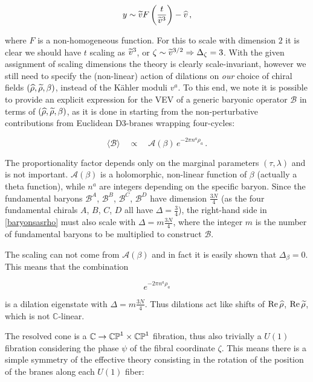 \begin{equation}
	y \sim \widetilde{v} F\left( \frac{t}{{\widetilde{v}}^3} \right) - \widehat{v}\,,
	\label{}
\end{equation}

where $F$ is a non-homogeneous function. For this to scale with dimension $2$ it is clear we should have $t$ scaling as $\widetilde{v}^3$, or $\zeta \sim {\ensuremath{\widetilde{v}}}^{3/2} \Rightarrow \Delta_\zeta = 3$. With the given assignment of scaling dimensions the theory is clearly scale-invariant, however we still need to specify the (non-linear) action of dilations on \emph{our} choice of chiral fields $(\widehat{\rho},\widetilde{\rho},\beta)$, instead of the K\"ahler moduli $v^a$. To this end, we note it is possible to provide an explicit expression for the VEV of a generic baryonic operator $\mathcal{B}$ in terms of $(\widehat{\rho}, \widetilde{\rho}, \beta)$, as it is done in \cite{MZ} starting from the non-perturbative contributions from Euclidean D3-branes wrapping four-cycles:

\begin{equation}
	\langle \mathcal{B} \rangle \quad \propto \quad \mathcal{A}(\beta) \, e^{-2\pi n^a \rho_a}\,.
	\label{baryonsasrho}
\end{equation}

The proportionality factor depends only on the marginal parameters $(\tau,\lambda)$ and is not important. $\mathcal{A}(\beta)$ is a holomorphic, non-linear function of $\beta$ (actually a theta function), while $n^a$ are integers depending on the specific baryon. Since the fundamental baryons $\mathcal{B}^A$, $\mathcal{B}^B$, $\mathcal{B}^C$, $\mathcal{B}^D$ have dimension $\frac{3N}{4}$ (as the four fundamental chirals $A$, $B$, $C$, $D$ all have $\Delta = \frac{3}{4}$), the right-hand side in \eqref{baryonsasrho} must also scale with $\Delta = m\frac{3N}{4}$, where the integer $m$ is the number of fundamental baryons to be multiplied to construct $\mathcal{B}$.

The scaling can not come from $\mathcal{A}(\beta)$ and in fact it is easily shown that $\Delta_\beta = 0$. This means that the combination

\begin{equation}
	e^{-2\pi n^a \rho_a}
	\label{}
\end{equation}

is a dilation eigenstate with $\Delta = m\frac{3N}{4}$. Thus dilations act like shifts of $\operatorname{Re} \widehat{\rho}$, $\operatorname{Re} \widetilde{\rho}$, which is not $\mathbb{C}$-linear.

The resolved cone is a $\mathbb{C} \rightarrow \mathbb{CP}^1 \times \mathbb{CP}^1$ fibration, thus also trivially a $U(1)$ fibration considering the phase $\psi$ of the fibral coordinate $\zeta$. This means there is a simple symmetry of the effective theory consisting in the rotation of the position of the branes along each $U(1)$ fiber:

